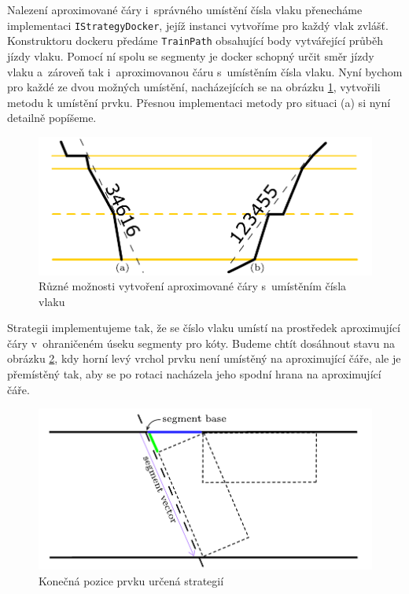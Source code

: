 Nalezení aproximované čáry i~správného umístění čísla vlaku přenecháme implementaci \texttt{IStrategyDocker}, jejíž instanci vytvoříme pro každý vlak zvlášť. Konstruktoru dockeru předáme \texttt{TrainPath} obsahující body vytvářející průběh jízdy vlaku. Pomocí ní spolu se segmenty je docker schopný určit směr jízdy vlaku a~zároveň tak i~aproximovanou čáru s~umístěním čísla vlaku. Nyní bychom pro každé ze dvou možných umístění, nacházejících se na obrázku \ref{fig:kap5:strategy_aproximation_methods}, vytvořili metodu k umístění prvku. Přesnou implementaci metody pro situaci (a) si nyní detailně popíšeme.

\begin{figure}[!hbt]
	\centering
	\includegraphics[width=.8\textwidth]{../img/kap5_approx_lines_two_types}
	\caption{Různé možnosti vytvoření aproximované čáry s~umístěním čísla vlaku}
	\label{fig:kap5:strategy_aproximation_methods}
\end{figure}

Strategii implementujeme tak, že se číslo vlaku umístí na prostředek aproximující čáry v~ohraničeném úseku segmenty pro kóty. Budeme chtít dosáhnout stavu na obrázku \ref{fig:kap5:strategy_aproximation_placement}, kdy horní levý vrchol prvku není umístěný na aproximující čáře, ale je přemístěný tak, aby se po rotaci nacházela jeho spodní hrana na aproximující čáře.

\begin{figure}[!hbt]
	\centering
	\includegraphics[width=.8\textwidth]{../img/kap5_strategy_implementation}
	\caption{Konečná pozice prvku určená strategií}
	\label{fig:kap5:strategy_aproximation_placement}
\end{figure}

